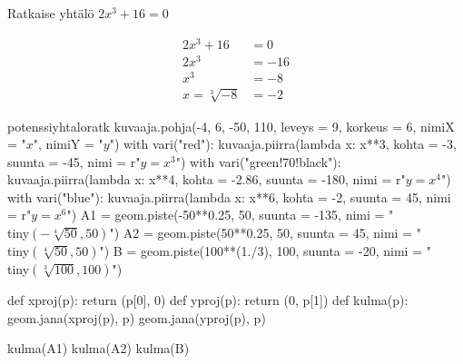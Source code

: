 
\begin{esimerkki}
Ratkaise yhtälö $2x^3 + 16 = 0$

	\begin{align*}
	2x^3 + 16 &= 0 \\
	2x^3 &= -16 \\
	x^3 &= -8  \\
	x = \sqrt[3]{-8} &= -2
	\end{align*}
\end{esimerkki}

\begin{esimerkki}
\end{esimerkki}

\begin{luoKuva}{potenssiyhtaloratk}
	kuvaaja.pohja(-4, 6, -50, 110, leveys = 9, korkeus = 6, nimiX = "$x$", nimiY = "$y$")
	with vari("red"): kuvaaja.piirra(lambda x: x**3, kohta = -3, suunta = -45, nimi = r"$y = x^3$")
	with vari("green!70!black"): kuvaaja.piirra(lambda x: x**4, kohta = -2.86, suunta = -180, nimi = r"$y = x^4$")
	with vari("blue"): kuvaaja.piirra(lambda x: x**6, kohta = -2, suunta = 45, nimi = r"$y = x^6$")
	A1 = geom.piste(-50**0.25, 50, suunta = -135, nimi = "\\tiny$(-\sqrt[4]{50}, 50)$")
	A2 = geom.piste(50**0.25, 50, suunta = 45, nimi = "\\tiny$(\sqrt[4]{50}, 50)$")
	B = geom.piste(100**(1./3), 100, suunta = -20, nimi = "\\tiny$(\sqrt[3]{100}, 100)$")
	
	def xproj(p): return (p[0], 0)
	def yproj(p): return (0, p[1])
	def kulma(p):
		geom.jana(xproj(p), p)
		geom.jana(yproj(p), p)
	
	kulma(A1)
	kulma(A2)
	kulma(B)
\end{luoKuva}
\begin{esimerkki}
	\begin{center}
	\end{center}
\end{esimerkki}

